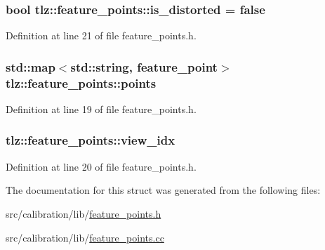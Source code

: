\subsubsection[{\texorpdfstring{is\+\_\+distorted}{is_distorted}}]{\setlength{\rightskip}{0pt plus 5cm}bool tlz\+::feature\+\_\+points\+::is\+\_\+distorted = false}\hypertarget{structtlz_1_1feature__points_a12753624989e36296202481e4f8f4147}{}\label{structtlz_1_1feature__points_a12753624989e36296202481e4f8f4147}


Definition at line 21 of file feature\+\_\+points.\+h.

\subsubsection[{\texorpdfstring{points}{points}}]{\setlength{\rightskip}{0pt plus 5cm}std\+::map$<$std\+::string, {\bf feature\+\_\+point}$>$ tlz\+::feature\+\_\+points\+::points}\hypertarget{structtlz_1_1feature__points_a6a8a228f04b6decf87126a0fc4194e57}{}\label{structtlz_1_1feature__points_a6a8a228f04b6decf87126a0fc4194e57}


Definition at line 19 of file feature\+\_\+points.\+h.

\subsubsection[{\texorpdfstring{view\+\_\+idx}{view_idx}}]{ tlz\+::feature\+\_\+points\+::view\+\_\+idx}\hypertarget{structtlz_1_1feature__points_ad267674b24423a95053c47ee371f78d6}{}\label{structtlz_1_1feature__points_ad267674b24423a95053c47ee371f78d6}


Definition at line 20 of file feature\+\_\+points.\+h.



The documentation for this struct was generated from the following files\+:\begin{DoxyCompactItemize}
\item 
src/calibration/lib/\hyperlink{feature__points_8h}{feature\+\_\+points.\+h}\item 
src/calibration/lib/\hyperlink{feature__points_8cc}{feature\+\_\+points.\+cc}\end{DoxyCompactItemize}
